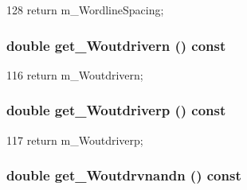 \begin{DoxyCode}
128 { return m_WordlineSpacing; }
\end{DoxyCode}
\hypertarget{classTechParameter_a2688ed045e7fb78d9905aaef19ca89a5}{
\subsubsection[{get\_\-Woutdrivern}]{\setlength{\rightskip}{0pt plus 5cm}double get\_\-Woutdrivern () const}}
\label{classTechParameter_a2688ed045e7fb78d9905aaef19ca89a5}



\begin{DoxyCode}
116 { return m_Woutdrivern; }
\end{DoxyCode}
\hypertarget{classTechParameter_ac0425084ba57462d4d7f93ffb8e09c31}{
\subsubsection[{get\_\-Woutdriverp}]{\setlength{\rightskip}{0pt plus 5cm}double get\_\-Woutdriverp () const}}
\label{classTechParameter_ac0425084ba57462d4d7f93ffb8e09c31}



\begin{DoxyCode}
117 { return m_Woutdriverp; }
\end{DoxyCode}
\hypertarget{classTechParameter_ac9b083ac3d196fcf9192115168897c55}{
\subsubsection[{get\_\-Woutdrvnandn}]{\setlength{\rightskip}{0pt plus 5cm}double get\_\-Woutdrvnandn () const}}
\label{classTechParameter_ac9b083ac3d196fcf9192115168897c55}



